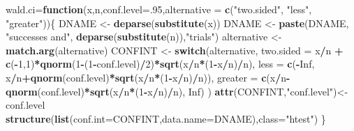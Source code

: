 \documentclass[]{book}
\newenvironment{Shaded}{\begin{snugshade}}{\end{snugshade}}
\newcommand{\KeywordTok}[1]{\textcolor[rgb]{0.13,0.29,0.53}{\textbf{#1}}}
\newcommand{\DataTypeTok}[1]{\textcolor[rgb]{0.13,0.29,0.53}{#1}}
\newcommand{\DecValTok}[1]{\textcolor[rgb]{0.00,0.00,0.81}{#1}}
\newcommand{\StringTok}[1]{\textcolor[rgb]{0.31,0.60,0.02}{#1}}
\newcommand{\OtherTok}[1]{\textcolor[rgb]{0.56,0.35,0.01}{#1}}
\newcommand{\ControlFlowTok}[1]{\textcolor[rgb]{0.13,0.29,0.53}{\textbf{#1}}}
\newcommand{\OperatorTok}[1]{\textcolor[rgb]{0.81,0.36,0.00}{\textbf{#1}}}
\newcommand{\NormalTok}[1]{#1}
\theoremstyle{definition}
\theoremstyle{definition}
\theoremstyle{definition}
\theoremstyle{remark}
\begin{document}
\begin{Shaded}
\begin{Highlighting}[]
\NormalTok{wald.ci=}\ControlFlowTok{function}\NormalTok{(x,n,}\DataTypeTok{conf.level=}\NormalTok{.}\DecValTok{95}\NormalTok{,}\DataTypeTok{alternative =} \KeywordTok{c}\NormalTok{(}\StringTok{"two.sided"}\NormalTok{, }\StringTok{"less"}\NormalTok{, }\StringTok{"greater"}\NormalTok{))\{}
\NormalTok{  DNAME <-}\StringTok{ }\KeywordTok{deparse}\NormalTok{(}\KeywordTok{substitute}\NormalTok{(x))}
\NormalTok{  DNAME <-}\StringTok{ }\KeywordTok{paste}\NormalTok{(DNAME, }\StringTok{"successes and"}\NormalTok{, }\KeywordTok{deparse}\NormalTok{(}\KeywordTok{substitute}\NormalTok{(n)),}\StringTok{"trials"}\NormalTok{)}
\NormalTok{  alternative <-}\StringTok{ }\KeywordTok{match.arg}\NormalTok{(alternative)}
\NormalTok{  CONFINT <-}\StringTok{ }\ControlFlowTok{switch}\NormalTok{(alternative,}
                    \DataTypeTok{two.sided =}\NormalTok{ x}\OperatorTok{/}\NormalTok{n }\OperatorTok{+}
\StringTok{                      }\KeywordTok{c}\NormalTok{(}\OperatorTok{-}\DecValTok{1}\NormalTok{,}\DecValTok{1}\NormalTok{)}\OperatorTok{*}\KeywordTok{qnorm}\NormalTok{(}\DecValTok{1}\OperatorTok{-}\NormalTok{(}\DecValTok{1}\OperatorTok{-}\NormalTok{conf.level)}\OperatorTok{/}\DecValTok{2}\NormalTok{)}\OperatorTok{*}\KeywordTok{sqrt}\NormalTok{(x}\OperatorTok{/}\NormalTok{n}\OperatorTok{*}\NormalTok{(}\DecValTok{1}\OperatorTok{-}\NormalTok{x}\OperatorTok{/}\NormalTok{n)}\OperatorTok{/}\NormalTok{n),}
                    \DataTypeTok{less =} \KeywordTok{c}\NormalTok{(}\OperatorTok{-}\OtherTok{Inf}\NormalTok{, x}\OperatorTok{/}\NormalTok{n}\OperatorTok{+}\KeywordTok{qnorm}\NormalTok{(conf.level)}\OperatorTok{*}\KeywordTok{sqrt}\NormalTok{(x}\OperatorTok{/}\NormalTok{n}\OperatorTok{*}\NormalTok{(}\DecValTok{1}\OperatorTok{-}\NormalTok{x}\OperatorTok{/}\NormalTok{n)}\OperatorTok{/}\NormalTok{n)),}
                    \DataTypeTok{greater =} \KeywordTok{c}\NormalTok{(x}\OperatorTok{/}\NormalTok{n}\OperatorTok{-}\KeywordTok{qnorm}\NormalTok{(conf.level)}\OperatorTok{*}\KeywordTok{sqrt}\NormalTok{(x}\OperatorTok{/}\NormalTok{n}\OperatorTok{*}\NormalTok{(}\DecValTok{1}\OperatorTok{-}\NormalTok{x}\OperatorTok{/}\NormalTok{n)}\OperatorTok{/}\NormalTok{n), }\OtherTok{Inf}\NormalTok{)}
\NormalTok{  )}
  \KeywordTok{attr}\NormalTok{(CONFINT,}\StringTok{"conf.level"}\NormalTok{)<-conf.level}
  \KeywordTok{structure}\NormalTok{(}\KeywordTok{list}\NormalTok{(}\DataTypeTok{conf.int=}\NormalTok{CONFINT,}\DataTypeTok{data.name=}\NormalTok{DNAME),}\DataTypeTok{class=}\StringTok{"htest"}\NormalTok{)}
\NormalTok{\}}
\end{Highlighting}
\end{Shaded}
\end{document}
